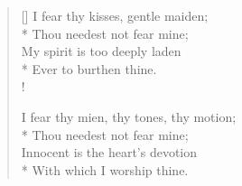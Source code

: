\documentclass[MAIN]{subfiles}
\begin{document}
\settowidth{\versewidth}{I fear thy kisses, gentle maiden;}
\begin{verse}[\versewidth]
I fear thy kisses, gentle maiden;\\*
\vin Thou needest not fear mine;\\
My spirit is too deeply laden\\*
\vin Ever to burthen thine.\\!

I fear thy mien, thy tones, thy motion;\\*
\vin Thou needest not fear mine;\\
Innocent is the heart's devotion\\*
\vin With which I worship thine.
\end{verse}
\end{document}
